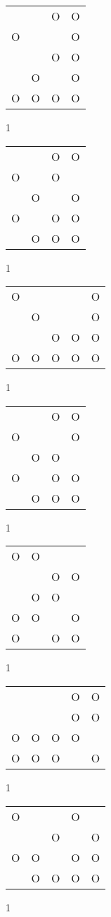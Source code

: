 \begin{tabular}{|m{0.2cm}m{0.2cm}m{0.2cm}m{0.2cm}|}\hline
 & &O&O\\
O& & &O\\
 & &O&O\\
 &O& &O\\
O&O&O&O\\
\hline\end{tabular}1
\begin{tabular}{|m{0.2cm}m{0.2cm}m{0.2cm}m{0.2cm}|}\hline
 & &O&O\\
O& &O& \\
 &O& &O\\
O& &O&O\\
 &O&O&O\\
\hline\end{tabular}1
\begin{tabular}{|m{0.2cm}m{0.2cm}m{0.2cm}m{0.2cm}m{0.2cm}|}\hline
O& & & &O\\
 &O& & &O\\
 & &O&O&O\\
O&O&O&O&O\\
\hline\end{tabular}1
\begin{tabular}{|m{0.2cm}m{0.2cm}m{0.2cm}m{0.2cm}|}\hline
 & &O&O\\
O& & &O\\
 &O&O& \\
O& &O&O\\
 &O&O&O\\
\hline\end{tabular}1
\begin{tabular}{|m{0.2cm}m{0.2cm}m{0.2cm}m{0.2cm}|}\hline
O&O& & \\
 & &O&O\\
 &O&O& \\
O&O& &O\\
O& &O&O\\
\hline\end{tabular}1
\begin{tabular}{|m{0.2cm}m{0.2cm}m{0.2cm}m{0.2cm}m{0.2cm}|}\hline
 & & &O&O\\
 & & &O&O\\
O&O&O&O& \\
O&O&O& &O\\
\hline\end{tabular}1
\begin{tabular}{|m{0.2cm}m{0.2cm}m{0.2cm}m{0.2cm}m{0.2cm}|}\hline
O& & &O& \\
 & &O& &O\\
O&O& &O&O\\
 &O&O&O&O\\
\hline\end{tabular}1
